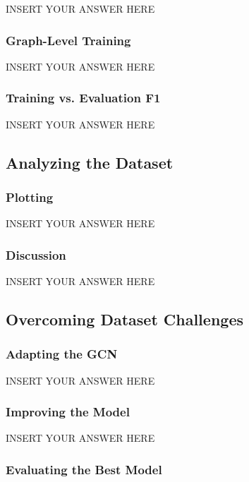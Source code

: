 \documentclass[a4paper,12pt]{article}
\begin{document}
INSERT YOUR ANSWER HERE


\subsubsection{Graph-Level Training}

INSERT YOUR ANSWER HERE


\subsubsection{Training vs. Evaluation F1}

INSERT YOUR ANSWER HERE


\subsection{Analyzing the Dataset}
\subsubsection{Plotting}

INSERT YOUR ANSWER HERE




\subsubsection{Discussion}

INSERT YOUR ANSWER HERE


\subsection{Overcoming Dataset Challenges}

\subsubsection{Adapting the GCN}

INSERT YOUR ANSWER HERE



\subsubsection{Improving the Model}

INSERT YOUR ANSWER HERE


\subsubsection{Evaluating the Best Model}
\end{document}
